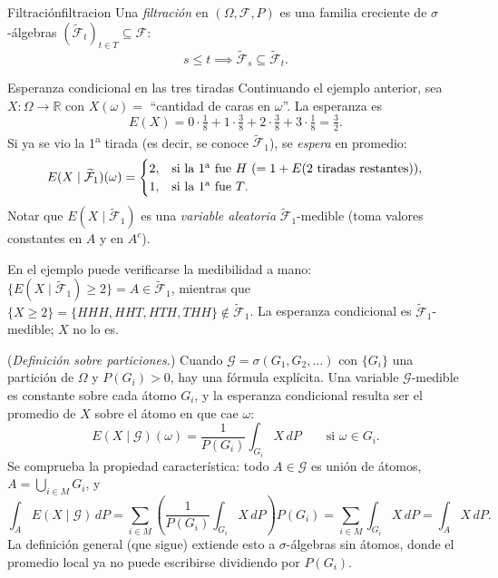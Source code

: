 \documentclass[11pt, a4paper]{article}
\begin{document}
\begin{definicion}{Filtración}{filtracion}
Una \emph{filtración} en $(\Omega, \mathcal{F}, P)$ es una familia creciente de
$\sigma$-álgebras $(\widetilde{\mathcal{F}}_t)_{t \in T} \subseteq \mathcal{F}$:
$$ s \le t \implies \widetilde{\mathcal{F}}_s \subseteq \widetilde{\mathcal{F}}_t. $$
\end{definicion}

\begin{ejemplo}{Esperanza condicional en las tres tiradas}{}
Continuando el ejemplo anterior, sea $X: \Omega \to \mathbb{R}$ con $X(\omega) = $ ``cantidad de
caras en $\omega$''. La esperanza es
$$ E(X) = 0 \cdot \tfrac{1}{8} + 1 \cdot \tfrac{3}{8} + 2 \cdot \tfrac{3}{8} + 3 \cdot \tfrac{1}{8}
= \tfrac{3}{2}. $$
Si ya se vio la 1\textsuperscript{a} tirada (es decir, se conoce $\widetilde{\mathcal{F}}_1$),
se \emph{espera} en promedio:
$$ E(X \mid \widetilde{\mathcal{F}}_1)(\omega) = \begin{cases}
2, & \text{si la 1\textsuperscript{a} fue $H$} \ (= 1 + E(\text{2 tiradas restantes})), \\
1, & \text{si la 1\textsuperscript{a} fue $T$}.
\end{cases} $$
Notar que $E(X \mid \widetilde{\mathcal{F}}_1)$ es una \emph{variable aleatoria}
$\widetilde{\mathcal{F}}_1$-medible (toma valores constantes en $A$ y en $A^c$).
\end{ejemplo}

\obs En el ejemplo puede verificarse la medibilidad a mano:
$\{E(X \mid \widetilde{\mathcal{F}}_1) \ge 2\} = A \in \widetilde{\mathcal{F}}_1$, mientras que
$\{X \ge 2\} = \{HHH, HHT, HTH, THH\} \notin \widetilde{\mathcal{F}}_1$. La esperanza
condicional es $\widetilde{\mathcal{F}}_1$-medible; $X$ no lo es.

\obs (\emph{Definición sobre particiones.}) Cuando $\mathcal{G} = \sigma(G_1, G_2, \dots)$ con
$\{G_i\}$ una partición de $\Omega$ y $P(G_i) > 0$, hay una fórmula explícita. Una variable
$\mathcal{G}$-medible es constante sobre cada átomo $G_i$, y la esperanza condicional resulta
ser el promedio de $X$ sobre el átomo en que cae $\omega$:
$$ E(X \mid \mathcal{G})(\omega) = \frac{1}{P(G_i)} \int_{G_i} X \, dP \qquad \text{si }
\omega \in G_i. $$
Se comprueba la propiedad característica: todo $A \in \mathcal{G}$ es unión de átomos,
$A = \bigcup_{i \in M} G_i$, y
$$ \int_A E(X \mid \mathcal{G}) \, dP = \sum_{i \in M} \left( \frac{1}{P(G_i)} \int_{G_i} X \,
dP \right) P(G_i) = \sum_{i \in M} \int_{G_i} X \, dP = \int_A X \, dP. $$
La definición general (que sigue) extiende esto a $\sigma$-álgebras sin átomos, donde el
promedio local ya no puede escribirse dividiendo por $P(G_i)$.
\end{document}
